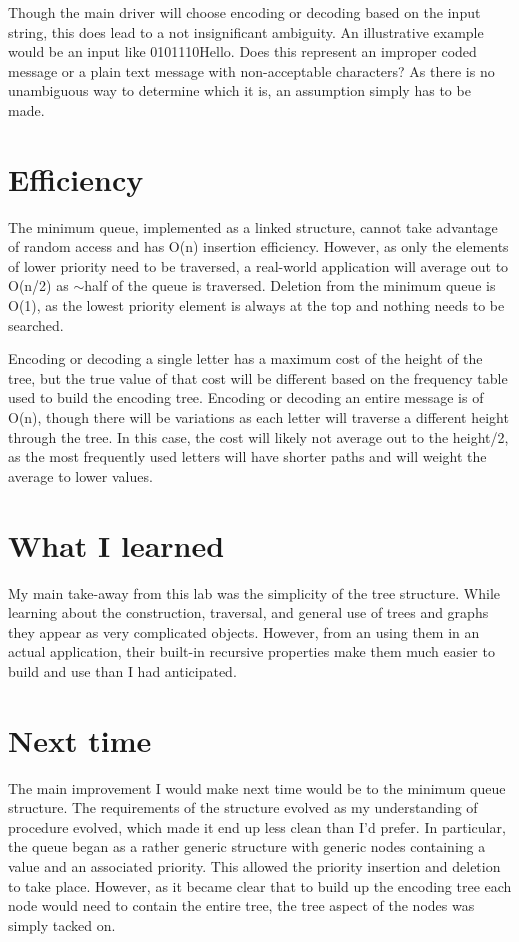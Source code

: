 \documentclass[a4paper,12pt]{article}
\begin{document}
Though the main driver will choose encoding or decoding based on the input string, this does lead to a not insignificant ambiguity.  An illustrative example would be an input like 0101110Hello.  Does this represent an improper coded message or a plain text message with non-acceptable characters?  As there is no unambiguous way to determine which it is, an assumption simply has to be made.


\section{Efficiency}
The minimum queue, implemented as a linked structure, cannot take advantage of random access and has O(n) insertion efficiency.  However, as only the elements of lower priority need to be traversed, a real-world application will average out to O(n/2) as $\sim$half of the queue is traversed.  Deletion from the minimum queue is O(1), as the lowest priority element is always at the top and nothing needs to be searched.  

Encoding or decoding a single letter has a maximum cost of the height of the tree, but the true value of that cost will be different based on the frequency table used to build the encoding tree.  Encoding or decoding an entire message is of O(n), though there will be variations as each letter will traverse a different height through the tree.  In this case, the cost will likely not average out to the height/2, as the most frequently used letters will have shorter paths and will weight the average to lower values.


\section{What I learned}
My main take-away from this lab was the simplicity of the tree structure.  While learning about the construction, traversal, and general use of trees and graphs they appear as very complicated objects.  However, from an using them in an actual application, their built-in recursive properties make them much easier to build and use than I had anticipated.  


\section{Next time}
The main improvement I would make next time would be to the minimum queue structure.  The requirements of the structure evolved as my understanding of procedure evolved, which made it end up less clean than I'd prefer.  In particular, the queue began as a rather generic structure with generic nodes containing a value and an associated priority.  This allowed the priority insertion and deletion to take place.  However, as it became clear that to build up the encoding tree each node would need to contain the entire tree, the tree aspect of the nodes was simply tacked on.
\end{document}
